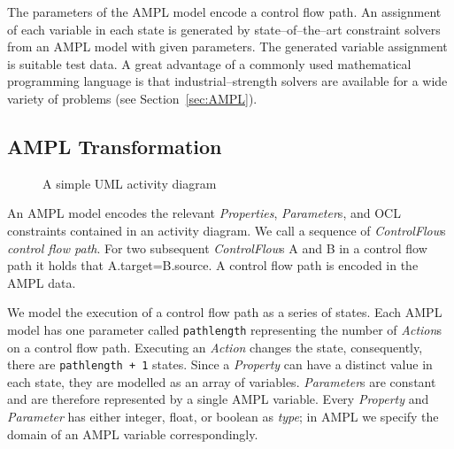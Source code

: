 \documentclass[runningheads,a4paper]{llncs}%
\newcommand{\UMLType}[1]{\textsf{\textit{#1}}} %
\newcommand{\UMLReference}[1]{\textsf{\textit{#1}}} %
\newcommand{\AMPLCode}[1]{\texttt{#1}}
\begin{document}
The parameters of the AMPL model encode a control flow path. An assignment of
each variable in each state is generated by state--of--the--art constraint
solvers from an AMPL model with given parameters. The generated variable
assignment is suitable test data. A great advantage of a commonly used
mathematical programming language is that industrial--strength solvers are
available for a wide variety of problems (see Section~\ref{sec:AMPL}).
\subsection{AMPL Transformation}%
\label{sec:AMPLTransformation}%
\begin{figure}%
\def\svgwidth{\textwidth}%
\graphicspath{{./pics/}}%
%
\caption{A simple UML activity diagram}%
\label{fig:AssignmentDecision}%
\end{figure}%
An AMPL model encodes the relevant \UMLType{Properties}, \UMLType{Parameter}s, and OCL constraints
contained in an activity diagram. We call a sequence of
\UMLReference{ControlFlow}s \emph{control flow path}. For two subsequent
\UMLType{ControlFlow}s A and B in a control flow path it holds that
A.target=B.source. A control flow path is encoded in the AMPL data.

We model the execution of a control flow path as a series of states. Each AMPL
model has one parameter called \AMPLCode{pathlength} representing the number of
\UMLType{Action}s on a control flow path. Executing an \UMLType{Action} changes
the state, consequently, there are \AMPLCode{pathlength + 1} states. Since a
\UMLType{Property} can have a distinct value in each state, they are modelled as
an array of variables. \UMLType{Parameter}s are constant and are therefore
represented by a single AMPL variable. Every \UMLType{Property} and
\UMLType{Parameter} has either integer, float, or boolean as
\UMLReference{type}; in AMPL we specify the domain of an AMPL variable
correspondingly.
\end{document}
